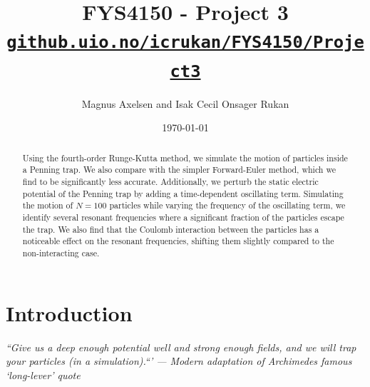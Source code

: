 \documentclass[english,notitlepage,reprint]{revtex4-2}  %
\begin{document}
\title{FYS4150 - Project 3\\[0.5em]
  \small \href{https://github.uio.no/icrukan/FYS4150/tree/master/Project3}{\texttt{github.uio.no/icrukan/FYS4150/Project3}}
}
\author{Magnus Axelsen and Isak Cecil Onsager Rukan} %
\date{\today}                             %
\noaffiliation                            %

\begin{abstract}
    Using the fourth-order Runge-Kutta method, we simulate the motion of particles inside a Penning trap.
    We also compare with the simpler Forward-Euler method, which we find to be significantly less accurate.
    Additionally, we perturb the static electric potential of the Penning trap by adding a time-dependent oscillating term.
    Simulating the motion of $N=100$ particles while varying the frequency of the oscillating term, we identify several resonant frequencies where a significant fraction of the particles escape the trap.
    We also find that the Coulomb interaction between the particles has a noticeable effect on the resonant frequencies, shifting them slightly compared to the non-interacting case.
\end{abstract}
\maketitle

\section{Introduction}
\begin{center}
\textit{``Give us a deep enough potential well and strong enough fields, and we will trap your particles (in a simulation).``' — Modern adaptation of Archimedes famous `long-lever' quote \cite{pappus_synagoge}}
\end{center}
\end{document}
